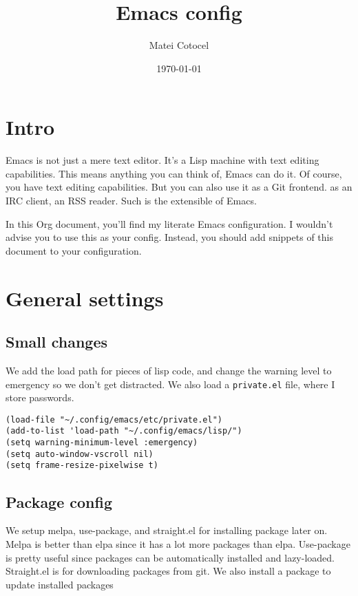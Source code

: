 \documentclass[11pt]{article}
\author{Matei Cotocel}
\date{\today}
\title{Emacs config}
\begin{document}
\maketitle
\tableofcontents


\section*{Intro}
\label{sec:org84cda55}

Emacs is not just a mere text editor. It's a Lisp machine with text editing capabilities. This means anything you can think of, Emacs can do it. Of course, you have text editing capabilities. But you can also use it as a Git frontend. as an IRC client, an RSS reader. Such is the extensible of Emacs.

In this Org document, you'll find my literate Emacs configuration. I wouldn't advise you to use this as your config. Instead, you should add snippets of this document to your configuration.

\section*{General settings}
\label{sec:org592848c}

\subsection*{Small changes}
\label{sec:orgf643ef9}

We add the load path for pieces of lisp code, and change the warning level to emergency so we don't get distracted. We also load a \texttt{private.el} file, where I store passwords.

\begin{verbatim}
(load-file "~/.config/emacs/etc/private.el")
(add-to-list 'load-path "~/.config/emacs/lisp/")
(setq warning-minimum-level :emergency)
(setq auto-window-vscroll nil)
(setq frame-resize-pixelwise t)
\end{verbatim}

\subsection*{Package config}
\label{sec:orge8119ae}

We setup melpa, use-package, and straight.el for installing package later on. Melpa is better than elpa since it has a lot more packages than elpa. Use-package is pretty useful since packages can be automatically installed and lazy-loaded. Straight.el is for downloading packages from git. We also install a package to update installed packages
\end{document}
